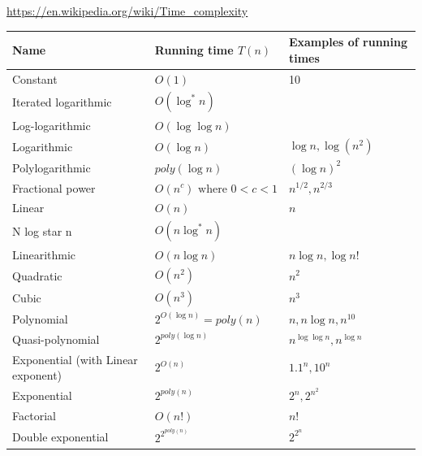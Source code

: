 \documentclass[english, 10pt]{article}
\begin{document}
\url{https://en.wikipedia.org/wiki/Time_complexity}
\begin{center}
    \begin{tabular}{l l l}
        Name                 & Running time $T(n)$                & Examples of running times        \\ \toprule
        Constant             & $ O(1)           $                 & 10                               \\ \midrule
        Iterated logarithmic & $ O(\log^* n)      $               & \\ \midrule
        Log-logarithmic      & $ O(\log \log n)   $               & \\ \midrule
        Logarithmic          & $ O(\log n) $                      & $ \log n, \log(n^2)$             \\ \midrule
        Polylogarithmic      & $ poly(\log n) $                   & $ {(\log n)}^2  $                  \\ \midrule
        Fractional power     & $ O(n^c) \text{ where }0 < c < 1 $ & $ n^{1/2}, n^{2/3}$              \\ \midrule
        Linear               & $ O(n) $                           & $ n$                             \\ \midrule
        N log star n         & $ O(n \log^* n) $                  & $   $                            \\ \midrule
        Linearithmic         & $ O(n \log n)$                     & $  n \log n, \log n! $           \\ \midrule
        Quadratic            & $ O(n^2) $                         & $  n^2 $                         \\ \midrule
        Cubic                & $ O(n^3) $                         & $  n^3 $                         \\ \midrule
        Polynomial           & $ 2^{O(\log n)} = poly(n)$         & $  n, n\log n, n^{10} $          \\ \midrule
        Quasi-polynomial     & $ 2^{poly(\log n)} $               & $  n^{\log \log n}, n^{\log n}$   \\ \midrule
        Exponential (with
        Linear exponent)   & $ 2^{O(n)} $        & $  1.1^n, 10^n $                 \\ \midrule
        Exponential        & $ 2^{poly(n)} $     & $  2^n, 2^{n^2}  $               \\ \midrule
        Factorial          & $ O(n\text{!}) $    & $  n\text{!}$                    \\ \midrule
        Double exponential & $ 2^{2^{poly(n)}} $ & $  2^{2^n}$                      \\
        \bottomrule
    \end{tabular}
\end{center}
\end{document}

